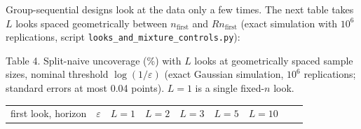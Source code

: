 \documentclass[
  10pt,
  a4paper,
]{article}
\newcounter{none} %
\begin{document}
Group-sequential designs look at the data only a few times. The next
table takes \(L\) looks spaced geometrically between
\(n_{\mathrm{first}}\) and \(Rn_{\mathrm{first}}\) (exact simulation
with \(10^6\) replications, script
\texttt{looks\_and\_mixture\_controls.py}):

Table 4. Split-naive uncoverage (\%) with \(L\) looks at geometrically
spaced sample sizes, nominal threshold \(\log(1/\varepsilon)\) (exact
Gaussian simulation, \(10^6\) replications; standard errors at most 0.04
points). \(L=1\) is a single fixed-\(n\) look.

{\def\LTcaptype{none} %
\begin{longtable}[]{@{}
  >{\raggedright\arraybackslash}p{}
  >{\raggedright\arraybackslash}p{}
  >{\raggedright\arraybackslash}p{}
  >{\raggedright\arraybackslash}p{}
  >{\raggedright\arraybackslash}p{}
  >{\raggedright\arraybackslash}p{}
  >{\raggedright\arraybackslash}p{}
  >{\raggedright\arraybackslash}p{}
  >{\raggedright\arraybackslash}p{}@{}}
\toprule\noalign{}
\begin{minipage}[b]{\linewidth}\raggedright
first look, horizon
\end{minipage} & \begin{minipage}[b]{\linewidth}\raggedright
\(\varepsilon\)
\end{minipage} & \begin{minipage}[b]{\linewidth}\raggedright
\(L=1\)
\end{minipage} & \begin{minipage}[b]{\linewidth}\raggedright
\(L=2\)
\end{minipage} & \begin{minipage}[b]{\linewidth}\raggedright
\(L=3\)
\end{minipage} & \begin{minipage}[b]{\linewidth}\raggedright
\(L=5\)
\end{minipage} & \begin{minipage}[b]{\linewidth}\raggedright
\(L=10\)
\end{minipage} & \begin{minipage}[b]{\linewidth}\raggedright

\end{minipage}
\end{longtable}}
\end{document}
